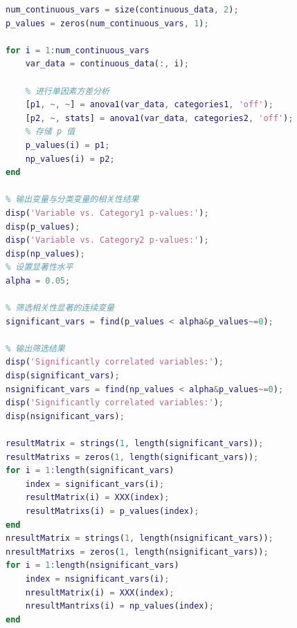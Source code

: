 \documentclass{cumcmthesis}
\begin{document}
\begin{appendices}
\begin{lstlisting}[language=matlab]
% 进行单因素方差分析
num_continuous_vars = size(continuous_data, 2);
p_values = zeros(num_continuous_vars, 1);

for i = 1:num_continuous_vars
    var_data = continuous_data(:, i);
    
    % 进行单因素方差分析
    [p1, ~, ~] = anova1(var_data, categories1, 'off');
    [p2, ~, stats] = anova1(var_data, categories2, 'off');
    % 存储 p 值
    p_values(i) = p1;
    np_values(i) = p2;
end

% 输出变量与分类变量的相关性结果
disp('Variable vs. Category1 p-values:');
disp(p_values);
disp('Variable vs. Category2 p-values:');
disp(np_values);
% 设置显著性水平
alpha = 0.05;

% 筛选相关性显著的连续变量
significant_vars = find(p_values < alpha&p_values~=0);

% 输出筛选结果
disp('Significantly correlated variables:');
disp(significant_vars);
nsignificant_vars = find(np_values < alpha&p_values~=0);
disp('Significantly correlated variables:');
disp(nsignificant_vars);

resultMatrix = strings(1, length(significant_vars));
resultMatrixs = zeros(1, length(significant_vars));
for i = 1:length(significant_vars)
    index = significant_vars(i);
    resultMatrix(i) = XXX(index);
    resultMatrixs(i) = p_values(index);
end
nresultMatrix = strings(1, length(nsignificant_vars));
nresultMatrixs = zeros(1, length(nsignificant_vars));
for i = 1:length(nsignificant_vars)
    index = nsignificant_vars(i);
    nresultMatrix(i) = XXX(index);
    nresultMantrixs(i) = np_values(index);
end


\end{lstlisting}
\end{appendices}
\end{document}
